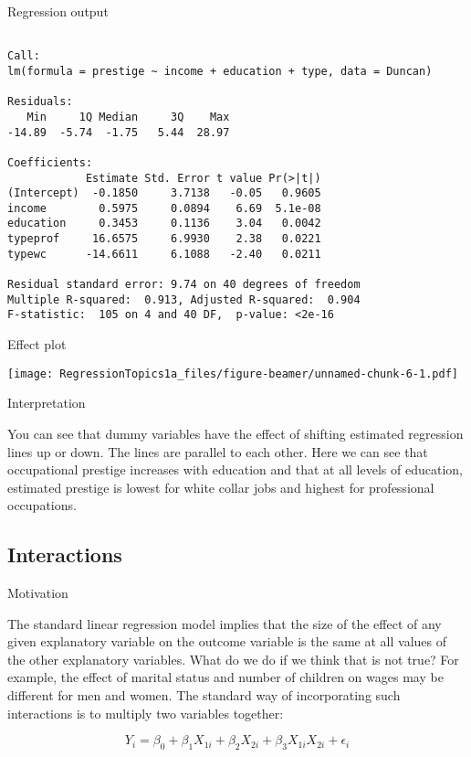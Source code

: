 \documentclass[10pt,ignorenonframetext,]{beamer}
\begin{document}
\begin{frame}[fragile]{Regression output}

\begin{verbatim}

Call:
lm(formula = prestige ~ income + education + type, data = Duncan)

Residuals:
   Min     1Q Median     3Q    Max
-14.89  -5.74  -1.75   5.44  28.97

Coefficients:
            Estimate Std. Error t value Pr(>|t|)
(Intercept)  -0.1850     3.7138   -0.05   0.9605
income        0.5975     0.0894    6.69  5.1e-08
education     0.3453     0.1136    3.04   0.0042
typeprof     16.6575     6.9930    2.38   0.0221
typewc      -14.6611     6.1088   -2.40   0.0211

Residual standard error: 9.74 on 40 degrees of freedom
Multiple R-squared:  0.913, Adjusted R-squared:  0.904
F-statistic:  105 on 4 and 40 DF,  p-value: <2e-16
\end{verbatim}

\end{frame}

\begin{frame}{Effect plot}

\texttt{[image: RegressionTopics1a\_files/figure-beamer/unnamed-chunk-6-1.pdf]}

\end{frame}

\begin{frame}{Interpretation}

You can see that dummy variables have the effect of shifting estimated
regression lines up or down. The lines are parallel to each other. Here
we can see that occupational prestige increases with education and that
at all levels of education, estimated prestige is lowest for white
collar jobs and highest for professional occupations.

\end{frame}

\subsection{Interactions}\label{interactions}

\begin{frame}{Motivation}

The standard linear regression model implies that the size of the effect
of any given explanatory variable on the outcome variable is the same at
all values of the other explanatory variables. What do we do if we think
that is not true? For example, the effect of marital status and number
of children on wages may be different for men and women. The standard
way of incorporating such interactions is to multiply two variables
together:

\[
Y_i = \beta_0 + \beta_1 X_{1i} + \beta_2 X_{2i} + \beta_3 X_{1i} X_{2i} + \epsilon_i
\]

\end{frame}
\end{document}
